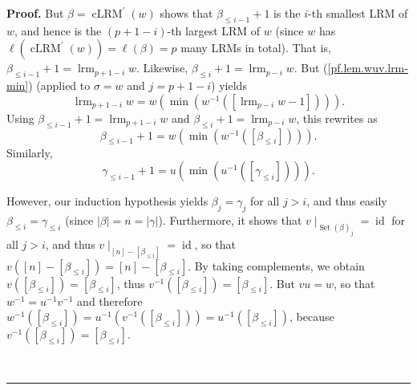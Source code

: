 \documentclass[submission]{FPSAC2026}
\newcommand{\id}{\operatorname{id}} %
\newcommand{\tup}[1]{\left( #1 \right)}
\newenvironment{proof}[1][Proof]{\noindent\textbf{#1.} }{\ \rule{0.5em}{0.5em}}
\begin{document}
\begin{proof}
But $\beta=\operatorname{cLRM}^{\prime}\left(  w\right)  $ shows that
$\beta_{\leq i-1}+1$ is the $i$-th smallest LRM of $w$, and hence is the
$\left(  p+1-i\right)  $-th largest LRM of $w$ (since $w$ has $\ell\left(
\operatorname{cLRM}^{\prime}(w)\right)  =\ell\tup{\beta} = p$
many LRMs in total). That is,
$\beta_{\leq i-1}+1=\operatorname*{lrm}\nolimits_{p+1-i}w$. Likewise,
$\beta_{\leq i}+1=\operatorname*{lrm}\nolimits_{p-i}w$. But
(\ref{pf.lem.wuv.lrm-min}) (applied to $\sigma=w$ and $j=p+1-i$) yields
\[
\operatorname*{lrm}\nolimits_{p+1-i}w=w\left(  \min\left(  w^{-1}\left(
\left[  \operatorname*{lrm}\nolimits_{p-i}w-1\right]  \right)  \right)
\right)  .
\]
Using $\beta_{\leq i-1}+1=\operatorname*{lrm}\nolimits_{p+1-i}w$ and
$\beta_{\leq i}+1=\operatorname*{lrm}\nolimits_{p-i}w$, this rewrites as%
\begin{equation}
\beta_{\leq i-1}+1=w\left(  \min\left(  w^{-1}\left(  \left[  \beta_{\leq
i}\right]  \right)  \right)  \right)  .\label{pf.lem.wuv.4b}%
\end{equation}
Similarly,%
\begin{equation}
\gamma_{\leq i-1}+1=u\left(  \min\left(  u^{-1}\left(  \left[  \gamma_{\leq
i}\right]  \right)  \right)  \right)  .\label{pf.lem.wuv.4g}%
\end{equation}

However, our induction hypothesis yields $\beta_{j}=\gamma_{j}$ for all $j>i$,
and thus easily $\beta_{\leq i}=\gamma_{\leq i}$ (since $\left\vert
\beta\right\vert =n=\left\vert \gamma\right\vert $). Furthermore, it shows
that $\left. v\mid_{\operatorname*{Set}\left(  \beta\right)  _{j}} \right.
= \id $ for all $j>i$, and thus
$\left. v\mid_{\left[  n\right]  -\left[  \beta_{\leq
i}\right]  }\right. = \id $,
so that
$v\tup{\left[  n\right]  -\left[  \beta_{\leq
i}\right]} = \left[  n\right]  -\left[  \beta_{\leq
i}\right]$.
By taking complements, we obtain
$v\tup{\left[  \beta_{\leq i}\right]} = \left[  \beta_{\leq i}\right]$,
thus
$v^{-1}\tup{\left[  \beta_{\leq i}\right]} = \left[  \beta_{\leq i}\right]$.
But $vu = w$, so that $w^{-1}=u^{-1}v^{-1}$ and therefore
$w^{-1}\left( \left[  \beta_{\leq i}\right]  \right)
= u^{-1}\left( v^{-1} \left( \left[  \beta_{\leq i}\right]  \right)\right)
= u^{-1}\left(  \left[  \beta_{\leq i}\right]  \right)  $,
because
$v^{-1}\tup{\left[  \beta_{\leq i}\right]} = \left[  \beta_{\leq i}\right]$.


\end{proof}
\end{document}
